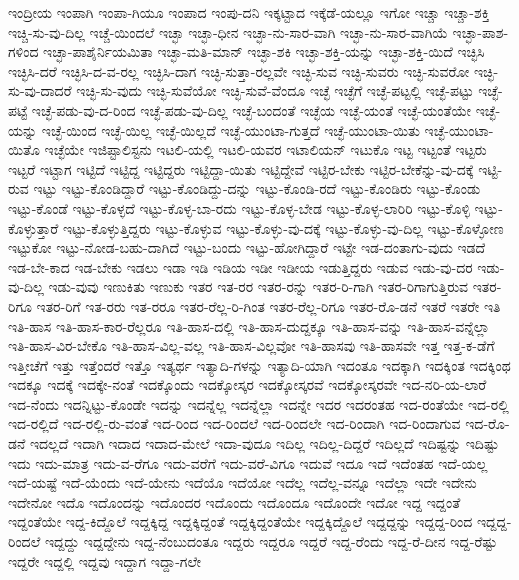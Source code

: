 ಇಂದ್ರೀಯ
ಇಂಪಾಗಿ
ಇಂಪಾ-ಗಿಯೂ
ಇಂಪಾದ
ಇಂಪು-ದನಿ
ಇಕ್ಕಟ್ಟಾದ
ಇಕ್ಕೆಡೆ-ಯಲ್ಲೂ
ಇಗೋ
ಇಚ್ಚಾ
ಇಚ್ಚಾ-ಶಕ್ತಿ
ಇಚ್ಚಿ-ಸು-ವು-ದಿಲ್ಲ
ಇಚ್ಚೆ-ಯಿಂದಲೆ
ಇಚ್ಛಾ
ಇಚ್ಛಾ-ಧೀನ
ಇಚ್ಛಾ-ನು-ಸಾರ-ವಾಗಿ
ಇಚ್ಛಾ-ನು-ಸಾರ-ವಾಗಿಯೆ
ಇಚ್ಛಾ-ಪಾಶ-ಗಳಿಂದ
ಇಚ್ಛಾ-ಪಾಶೈರ್ನಿಯಮಿತಾ
ಇಚ್ಛಾ-ಮತಿ-ಮಾನ್
ಇಚ್ಛಾ-ಶಕಿ
ಇಚ್ಛಾ-ಶಕ್ತಿ-ಯನ್ನು
ಇಚ್ಛಾ-ಶಕ್ತಿ-ಯಿದೆ
ಇಚ್ಛಿಸಿ
ಇಚ್ಛಿಸಿ-ದರೆ
ಇಚ್ಛಿಸಿ-ದ-ವ-ರಲ್ಲ
ಇಚ್ಛಿಸಿ-ದಾಗ
ಇಚ್ಛಿ-ಸುತ್ತಾ-ರಲ್ಲವೇ
ಇಚ್ಛಿ-ಸುವ
ಇಚ್ಛಿ-ಸುವರು
ಇಚ್ಛಿ-ಸುವರೋ
ಇಚ್ಛಿ-ಸು-ವು-ದಾದರೆ
ಇಚ್ಛಿ-ಸು-ವುದು
ಇಚ್ಛಿ-ಸುವೆಯೋ
ಇಚ್ಛಿ-ಸುವೆ-ವೆಂದೂ
ಇಚ್ಛೆ
ಇಚ್ಛೆಗೆ
ಇಚ್ಛೆ-ಪಟ್ಟಲ್ಲಿ
ಇಚ್ಛೆ-ಪಟ್ಟು
ಇಚ್ಛೆ-ಪಟ್ಟೆ
ಇಚ್ಛೆ-ಪಡು-ವು-ದ-ರಿಂದ
ಇಚ್ಛೆ-ಪಡು-ವು-ದಿಲ್ಲ
ಇಚ್ಛೆ-ಬಂದಂತೆ
ಇಚ್ಛೆಯ
ಇಚ್ಛೆ-ಯಂತೆ
ಇಚ್ಛೆ-ಯಂತೆಯೇ
ಇಚ್ಛೆ-ಯನ್ನು
ಇಚ್ಛೆ-ಯಿಂದ
ಇಚ್ಛೆ-ಯಿಲ್ಲ
ಇಚ್ಛೆ-ಯಿಲ್ಲದೆ
ಇಚ್ಛೆ-ಯುಂಟಾ-ಗುತ್ತದೆ
ಇಚ್ಛೆ-ಯುಂಟಾ-ಯಿತು
ಇಚ್ಛೆ-ಯುಂಟಾ-ಯಿತೊ
ಇಚ್ಛೆಯೇ
ಇಜಿಪ್ಟಾಲಿಸ್ಟನು
ಇಟಲಿ-ಯಲ್ಲಿ
ಇಟಲಿ-ಯವರ
ಇಟಾಲಿಯನ್
ಇಟುಕೊ
ಇಟ್ಟ
ಇಟ್ಟಂತೆ
ಇಟ್ಟರು
ಇಟ್ಟರೆ
ಇಟ್ಟಾಗ
ಇಟ್ಟಿದೆ
ಇಟ್ಟಿದ್ದ
ಇಟ್ಟಿದ್ದರು
ಇಟ್ಟಿದ್ದಾ-ಯಿತು
ಇಟ್ಟಿದ್ದೇವೆ
ಇಟ್ಟಿರ-ಬೇಕು
ಇಟ್ಟಿರ-ಬೇಕೆನ್ನು-ವು-ದಕ್ಕೆ
ಇಟ್ಟಿ-ರುವ
ಇಟ್ಟು
ಇಟ್ಟು-ಕೊಂಡಿದ್ದಾರೆ
ಇಟ್ಟು-ಕೊಂಡಿದ್ದು-ದನ್ನು
ಇಟ್ಟು-ಕೊಂಡಿ-ರದೆ
ಇಟ್ಟು-ಕೊಂಡಿರು
ಇಟ್ಟು-ಕೊಂಡು
ಇಟ್ಟು-ಕೊಂಡೆ
ಇಟ್ಟು-ಕೊಳ್ಳದೆ
ಇಟ್ಟು-ಕೊಳ್ಳ-ಬಾ-ರದು
ಇಟ್ಟು-ಕೊಳ್ಳ-ಬೇಡ
ಇಟ್ಟು-ಕೊಳ್ಳ-ಲಾರಿರಿ
ಇಟ್ಟು-ಕೊಳ್ಳಿ
ಇಟ್ಟು-ಕೊಳ್ಳುತ್ತಾರೆ
ಇಟ್ಟು-ಕೊಳ್ಳುತ್ತಿದ್ದರು
ಇಟ್ಟು-ಕೊಳ್ಳುವ
ಇಟ್ಟು-ಕೊಳ್ಳು-ವು-ದಕ್ಕೆ
ಇಟ್ಟು-ಕೊಳ್ಳು-ವು-ದಿಲ್ಲ
ಇಟ್ಟು-ಕೊಳ್ಳೋಣ
ಇಟ್ಟುಕೋ
ಇಟ್ಟು-ನೋಡ-ಬಹು-ದಾಗಿದೆ
ಇಟ್ಟು-ಬಂದು
ಇಟ್ಟು-ಹೋಗಿದ್ದಾರೆ
ಇಟ್ಟೇ
ಇಡ-ದಂತಾಗು-ವುದು
ಇಡದೆ
ಇಡ-ಬೇ-ಕಾದ
ಇಡ-ಬೇಕು
ಇಡಲು
ಇಡಾ
ಇಡಿ
ಇಡಿಯ
ಇಡೀ
ಇಡೀಯ
ಇಡುತ್ತಿದ್ದರು
ಇಡುವ
ಇಡು-ವು-ದರ
ಇಡು-ವು-ದಿಲ್ಲ
ಇಡು-ವುವು
ಇಣುಕಿತು
ಇಣುಕು
ಇತರ
ಇತ-ರರ
ಇತರ-ರನ್ನು
ಇತರ-ರಿ-ಗಾಗಿ
ಇತರ-ರಿಗಾಗುತ್ತಿರುವ
ಇತರ-ರಿಗೂ
ಇತರ-ರಿಗೆ
ಇತ-ರರು
ಇತ-ರರೂ
ಇತರ-ರೆಲ್ಲ-ರಿ-ಗಿಂತ
ಇತರ-ರೆಲ್ಲ-ರಿಗೂ
ಇತರ-ರೊ-ಡನೆ
ಇತರೆ
ಇತರೇ
ಇತಿ
ಇತಿ-ಹಾಸ
ಇತಿ-ಹಾಸ-ಕಾರ-ರೆಲ್ಲರೂ
ಇತಿ-ಹಾಸ-ದಲ್ಲಿ
ಇತಿ-ಹಾಸ-ದುದ್ದಕ್ಕೂ
ಇತಿ-ಹಾಸ-ವನ್ನು
ಇತಿ-ಹಾಸ-ವನ್ನೆಲ್ಲಾ
ಇತಿ-ಹಾಸ-ವಿರ-ಬೇಕೊ
ಇತಿ-ಹಾಸ-ವಿಲ್ಲ-ವಲ್ಲ
ಇತಿ-ಹಾಸ-ವಿಲ್ಲವೋ
ಇತಿ-ಹಾಸವು
ಇತಿ-ಹಾಸವೇ
ಇತ್ತ
ಇತ್ತ-ಕ-ಡೆಗೆ
ಇತ್ತೀಚೆಗೆ
ಇತ್ತು
ಇತ್ತೆಂದರೆ
ಇತ್ತೊ
ಇತ್ಯರ್ಥ
ಇತ್ಯಾದಿ-ಗಳನ್ನು
ಇತ್ಯಾದಿ-ಯಾಗಿ
ಇದಂತೂ
ಇದಕ್ಕಾಗಿ
ಇದಕ್ಕಿಂತ
ಇದಕ್ಕಿಂಥ
ಇದಕ್ಕೂ
ಇದಕ್ಕೆ
ಇದಕ್ಕೇ-ನಂತೆ
ಇದಕ್ಕೊಂದು
ಇದಕ್ಕೋಸ್ಕರ
ಇದಕ್ಕೋಸ್ಕರವೆ
ಇದಕ್ಕೋಸ್ಕರವೇ
ಇದ-ನರಿ-ಯ-ಲಾರೆ
ಇದ-ನೆಂದು
ಇದನ್ನಿಟ್ಟು-ಕೊಂಡೇ
ಇದನ್ನು
ಇದನ್ನೆಲ್ಲ
ಇದನ್ನೆಲ್ಲಾ
ಇದನ್ನೇ
ಇದರ
ಇದರಂತಹ
ಇದ-ರಂತೆಯೇ
ಇದ-ರಲ್ಲಿ
ಇದ-ರಲ್ಲಿದೆ
ಇದ-ರಲ್ಲಿ-ರು-ವಂತೆ
ಇದ-ರಿಂದ
ಇದ-ರಿಂದಲೆ
ಇದ-ರಿಂದಲೇ
ಇದ-ರಿಂದಾಗಿ
ಇದ-ರಿಂದಾಗುವ
ಇದ-ರೊ-ಡನೆ
ಇದಲ್ಲದೆ
ಇದಾಗಿ
ಇದಾದ
ಇದಾದ-ಮೇಲೆ
ಇದಾ-ವುದೂ
ಇದಿಲ್ಲ
ಇದಿಲ್ಲ-ದಿದ್ದರೆ
ಇದಿಲ್ಲದೆ
ಇದಿಷ್ಟನ್ನು
ಇದಿಷ್ಟು
ಇದು
ಇದು-ಮಾತ್ರ
ಇದು-ವ-ರೆಗೂ
ಇದು-ವರೆಗೆ
ಇದು-ವರೆ-ವಿಗೂ
ಇದುವೆ
ಇದೂ
ಇದೆ
ಇದೆಂತಹ
ಇದೆ-ಯಲ್ಲ
ಇದೆ-ಯಷ್ಟೆ
ಇದೆ-ಯೆಂದು
ಇದೆ-ಯೇನು
ಇದೆಯೊ
ಇದೆಯೋ
ಇದೆಲ್ಲ
ಇದೆಲ್ಲ-ವನ್ನೂ
ಇದೆಲ್ಲಾ
ಇದೇ
ಇದೇನು
ಇದೇನೋ
ಇದೊ
ಇದೊಂದನ್ನು
ಇದೊಂದರ
ಇದೊಂದು
ಇದೊಂದೂ
ಇದೊಂದೇ
ಇದೋ
ಇದ್ದ
ಇದ್ದಂತೆ
ಇದ್ದಂತೆಯೇ
ಇದ್ದ-ಕಿದ್ದೊಲೆ
ಇದ್ದಕ್ಕಿದ್ದ
ಇದ್ದಕ್ಕಿದ್ದಂತೆ
ಇದ್ದಕ್ಕಿದ್ದಂತೆಯೇ
ಇದ್ದಕ್ಕಿದ್ದೊಲೆ
ಇದ್ದದ್ದನ್ನು
ಇದ್ದದ್ದ-ರಿಂದ
ಇದ್ದದ್ದ-ರಿಂದಲೆ
ಇದ್ದದ್ದು
ಇದ್ದದ್ದೇನು
ಇದ್ದ-ನೆಂಬುದಂತೂ
ಇದ್ದರು
ಇದ್ದರೂ
ಇದ್ದರೆ
ಇದ್ದ-ರೆಂದು
ಇದ್ದ-ರೆ-ದೀನ
ಇದ್ದ-ರೆಷ್ಟು
ಇದ್ದರೇ
ಇದ್ದಲ್ಲಿ
ಇದ್ದವು
ಇದ್ದಾಗ
ಇದ್ದಾ-ಗಲೇ
